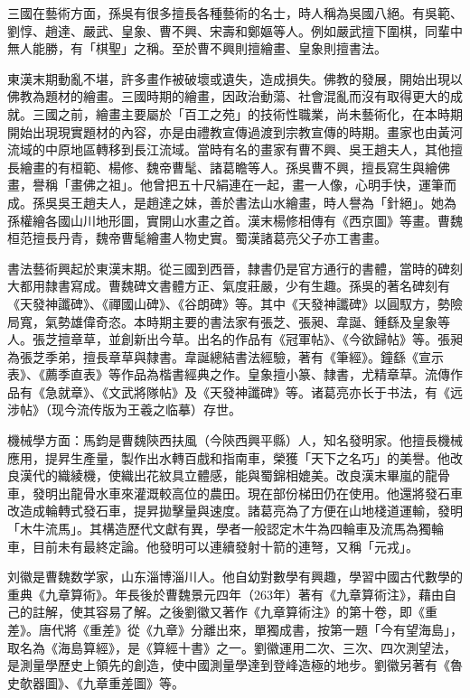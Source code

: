 三國在藝術方面，孫吳有很多擅長各種藝術的名士，時人稱為吳國八絕。有吳範、劉惇、趙達、嚴武、皇象、曹不興、宋壽和鄭嫗等人。例如嚴武擅下圍棋，同輩中無人能勝，有「棋聖」之稱。至於曹不興則擅繪畫、皇象則擅書法。

東漢末期動亂不堪，許多畫作被破壞或遺失，造成損失。佛教的發展，開始出現以佛教為題材的繪畫。三國時期的繪畫，因政治動蕩、社會混亂而沒有取得更大的成就。三國之前，繪畫主要屬於「百工之苑」的技術性職業，尚未藝術化，在本時期開始出現現實題材的內容，亦是由禮教宣傳過渡到宗教宣傳的時期。畫家也由黃河流域的中原地區轉移到長江流域。當時有名的畫家有曹不興、吳王趙夫人，其他擅長繪畫的有桓範、楊修、魏帝曹髦、諸葛瞻等人。孫吳曹不興，擅長寫生與繪佛畫，譽稱「畫佛之祖」。他曾把五十尺絹連在一起，畫一人像，心明手快，運筆而成。孫吳吳王趙夫人，是趙達之妹，善於書法山水繪畫，時人譽為「針絕」。她為孫權繪各國山川地形圖，實開山水畫之首。漢末楊修相傳有《西京圖》等畫。曹魏桓范擅長丹青，魏帝曹髦繪畫人物史實。蜀漢諸葛亮父子亦工書畫。

書法藝術興起於東漢末期。從三國到西晉，隸書仍是官方通行的書體，當時的碑刻大都用隸書寫成。曹魏碑文書體方正、氣度莊嚴，少有生趣。孫吳的著名碑刻有《天發神讖碑》、《禪國山碑》、《谷朗碑》等。其中《天發神讖碑》以圓馭方，勢險局寬，氣勢雄偉奇恣。本時期主要的書法家有張芝、張昶、韋誕、鍾繇及皇象等人。張芝擅章草，並創新出今草。出名的作品有《冠軍帖》、《今欲歸帖》等。張昶為張芝季弟，擅長章草與隸書。韋誕總結書法經驗，著有《筆經》。鐘繇《宣示表》、《薦季直表》等作品為楷書經典之作。皇象擅小篆、隸書，尤精章草。流傳作品有《急就章》、《文武將隊帖》及《天發神讖碑》等。诸葛亮亦长于书法，有《远涉帖》（现今流传版为王羲之临摹）存世。

機械學方面：馬鈞是曹魏陝西扶風（今陝西興平縣）人，知名發明家。他擅長機械應用，提昇生產量，製作出水轉百戲和指南車，榮獲「天下之名巧」的美譽。他改良漢代的織綾機，使織出花紋具立體感，能與蜀錦相媲美。改良漢末畢嵐的龍骨車，發明出龍骨水車來灌溉較高位的農田。現在部份梯田仍在使用。他還將發石車改造成輪轉式發石車，提昇拋擊量與速度。諸葛亮為了方便在山地棧道運輸，發明「木牛流馬」。其構造歷代文獻有異，學者一般認定木牛為四輪車及流馬為獨輪車，目前未有最終定論。他發明可以連續發射十箭的連弩，又稱「元戎」。

刘徽是曹魏数学家，山东淄博淄川人。他自幼對數學有興趣，學習中國古代數學的重典《九章算術》。年長後於曹魏景元四年（263年）著有《九章算術注》，藉由自己的註解，使其容易了解。之後劉徽又著作《九章算術注》的第十卷，即《重差》。唐代將《重差》從《九章》分離出來，單獨成書，按第一題「今有望海島」，取名為《海島算經》，是《算經十書》之一。劉徽運用二次、三次、四次測望法，是測量學歷史上領先的創造，使中國測量學達到登峰造極的地步。劉徽另著有《魯史欹器圖》、《九章重差圖》等。

